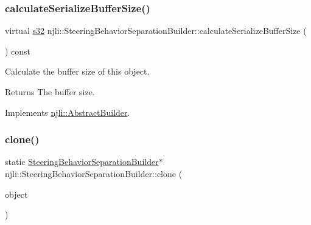 \mbox{\label{classnjli_1_1_steering_behavior_separation_builder_a70235857b545f56d073ce1a60d034e88}} 
\subsubsection{\texorpdfstring{calculate\+Serialize\+Buffer\+Size()}{calculateSerializeBufferSize()}}
{\footnotesize\ttfamily virtual \mbox{\hyperlink{_util_8h_aa62c75d314a0d1f37f79c4b73b2292e2}{s32}} njli\+::\+Steering\+Behavior\+Separation\+Builder\+::calculate\+Serialize\+Buffer\+Size (\begin{DoxyParamCaption}{ }\end{DoxyParamCaption}) const\hspace{0.3cm}{\ttfamily [virtual]}}

Calculate the buffer size of this object.

\begin{DoxyReturn}{Returns}
The buffer size. 
\end{DoxyReturn}


Implements \mbox{\hyperlink{classnjli_1_1_abstract_builder_aa1d220053e182c37b31b427499c6eacf}{njli\+::\+Abstract\+Builder}}.

\mbox{\label{classnjli_1_1_steering_behavior_separation_builder_af167db158a4fe186515d03c84e49351c}} 
\subsubsection{\texorpdfstring{clone()}{clone()}}
{\footnotesize\ttfamily static \mbox{\hyperlink{classnjli_1_1_steering_behavior_separation_builder}{Steering\+Behavior\+Separation\+Builder}}$\ast$ njli\+::\+Steering\+Behavior\+Separation\+Builder\+::clone (\begin{DoxyParamCaption}\item[{const \mbox{\hyperlink{classnjli_1_1_steering_behavior_separation_builder}{Steering\+Behavior\+Separation\+Builder}} \&}]{object }\end{DoxyParamCaption})\hspace{0.3cm}{\ttfamily [static]}}

